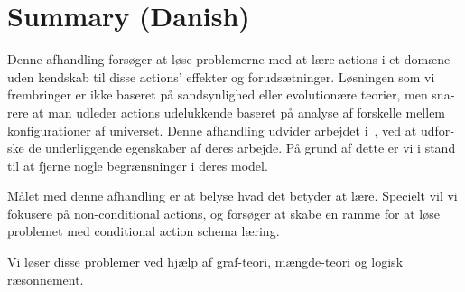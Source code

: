 \chapter{Summary (Danish)}
\begin{otherlanguage}{danish}

Denne afhandling forsøger at løse problemerne med at lære actions i et domæne uden kendskab til disse actions' effekter og forudsætninger. Løsningen som vi frembringer er ikke baseret på sandsynlighed eller evolutionære teorier, men snarere at man udleder actions udelukkende baseret på analyse af forskelle mellem konfigurationer af universet.
Denne afhandling udvider arbejdet i~\cite{Walsh2008},
ved at udforske de underliggende egenskaber af deres arbejde.
På grund af dette er vi i stand til at fjerne nogle begrænsninger i deres model.

Målet med denne afhandling er at belyse hvad det betyder at lære. Specielt vil vi fokusere på non-conditional actions, og forsøger at skabe en ramme for at løse problemet med conditional action schema læring.

Vi løser disse problemer ved hjælp af graf-teori, mængde-teori og logisk ræsonnement.

\end{otherlanguage}
